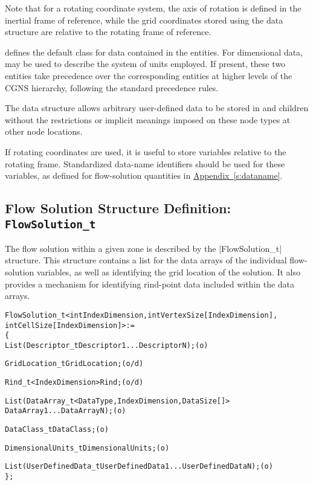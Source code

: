 Note that for a rotating coordinate system, the axis of rotation is
defined in the inertial frame of reference, while the grid coordinates
stored using the  data structure are
relative to the rotating frame of reference.

 defines the default class for data contained in the
 entities.
For dimensional data,  may be used to describe
the system of units employed.
If present, these two entities take precedence over the corresponding
entities at higher levels of the CGNS hierarchy, following the standard
precedence rules.

The  data structure allows arbitrary
user-defined data to be stored in  and
 children without the restrictions or implicit
meanings imposed on these node types at other node locations.

If rotating coordinates are used, it is useful to store variables
relative to the rotating frame.
Standardized data-name identifiers should be used for these variables,
as defined for flow-solution quantities in
\hyperref[s:dataname]{Appendix~\ref*{s:dataname}}.

\subsection{Flow Solution Structure Definition: \texttt{FlowSolution\_t}} 
\label{s:FlowSolution}

The flow solution within a given zone is described by the |FlowSolution_t|
structure.  This structure contains a list for the data arrays of the
individual flow-solution variables, as well as identifying the grid location
of the solution.  It also provides a mechanism for identifying rind-point
data included within the data arrays.

\begin{alltt}
  FlowSolution\_t< int IndexDimension, int VertexSize[IndexDimension], 
                  int CellSize[IndexDimension] > :=
    \{
    List( Descriptor\_t Descriptor1 ... DescriptorN ) ;                      (o)

    GridLocation\_t GridLocation ;                                           (o/d)

    Rind\_t<IndexDimension> Rind ;                                           (o/d)

    List( DataArray\_t<DataType, IndexDimension, DataSize[]> 
          DataArray1 ... DataArrayN ) ;                                     (o)

    DataClass\_t DataClass ;                                                 (o)
    
    DimensionalUnits\_t DimensionalUnits ;                                   (o)

    List( UserDefinedData\_t UserDefinedData1 ... UserDefinedDataN ) ;       (o)
    \} ;
\end{alltt}

